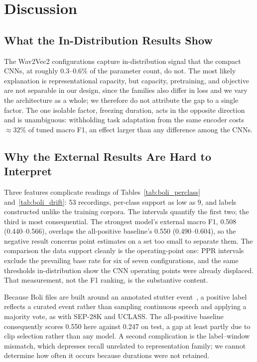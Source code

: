 \documentclass[a4paper,orivec]{llncs}
\begin{document}
\section{Discussion}
\label{sec:discussion}

\subsection{What the In-Distribution Results Show}
The Wav2Vec2 configurations capture in-distribution signal that the compact CNNs,
at roughly 0.3--0.6\% of the parameter count, do not. The most likely explanation
is representational capacity, but capacity, pretraining, and objective are not
separable in our design, since the families also differ in loss and we vary the
architecture as a whole; we therefore do not attribute the gap to a single
factor. The one isolable factor, freezing duration, acts in the opposite
direction and is unambiguous: withholding task adaptation from the same encoder
costs ${\approx}32\%$ of tuned macro F1, an effect larger than any difference
among the CNNs.

\subsection{Why the External Results Are Hard to Interpret}
\label{sec:interpret}
Three features complicate readings of Tables~\ref{tab:boli_perclass}
and~\ref{tab:boli_drift}: 53 recordings, per-class support as low as 9, and labels
constructed unlike the training corpora. The intervals quantify the first two;
the third is most consequential. The strongest model's external macro F1, 0.508
(0.440--0.566), overlaps the all-positive baseline's 0.550 (0.490--0.604), so the
negative result concerns point estimates on a set too small to separate them. The
comparison the data support cleanly is the operating-point one: PPR intervals
exclude the prevailing base rate for six of seven configurations, and the same
thresholds in-distribution show the CNN operating points were already displaced.
That measurement, not the F1 ranking, is the substantive content.

Because Boli files are built around an annotated stutter event~\cite{boli2025}, a
positive label reflects a curated event rather than sampling continuous speech and
applying a majority vote, as with SEP-28K and UCLASS. The all-positive baseline
consequently scores 0.550 here against 0.247 on test, a gap at least partly due to
clip selection rather than any model. A second complication is the label--window
mismatch, which depresses recall unrelated to representation family; we cannot
determine how often it occurs because durations were not retained.
\end{document}
